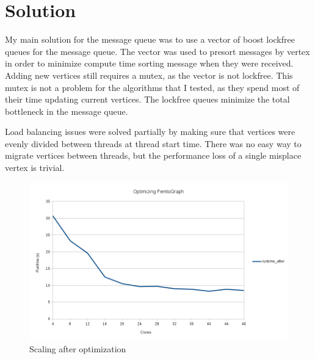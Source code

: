 \documentclass{sig-alternate-05-2015}
\begin{document}
\section{Solution}
\justify
My main solution for the message queue was to use a vector of boost lockfree queues for the message queue. The vector was used to presort messages by vertex in order to minimize compute time sorting message when they were received. Adding new vertices still requires a mutex, as the vector is not lockfree. This mutex is not a problem for the algorithms that I tested, as they spend most of their time updating current vertices. The lockfree queues minimize the total bottleneck in the message queue.

Load balancing issues were solved partially by making sure that vertices were evenly divided between threads at thread start time. There was no easy way to migrate vertices between threads, but the performance loss of a single misplace vertex is trivial.  

\begin{figure}
  \centering
  \includegraphics[width=\columnwidth]{after.png}
  \caption{Scaling after optimization}
\end{figure}
\end{document}
